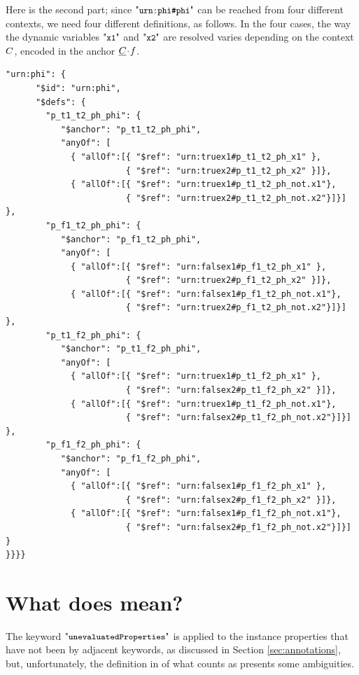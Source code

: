 \begin{toappendix}
{Here is the second part;
since $\qkw{urn:phi\#phi}$ can be reached from four different contexts, we need four different definitions, as follows.
In the four cases, the way the dynamic variables $\qkw{x1}$ and $\qkw{x2}$ are resolved varies depending on the context
$C$, encoded in the anchor $\underline{C}\!\cdot\! f$.

\begin{querybox}{}
\begin{lstlisting}[style=query,escapechar=Z]
    "urn:phi": {   
      "$id": "urn:phi",
      "$defs": {
        "p_t1_t2_ph_phi": {    
           "$anchor": "p_t1_t2_ph_phi", 
           "anyOf": [
             { "allOf":[{ "$ref": "urn:truex1#p_t1_t2_ph_x1" }, 
                        { "$ref": "urn:truex2#p_t1_t2_ph_x2" }]},
             { "allOf":[{ "$ref": "urn:truex1#p_t1_t2_ph_not.x1"}, 
                        { "$ref": "urn:truex2#p_t1_t2_ph_not.x2"}]}] },
        "p_f1_t2_ph_phi": {    
           "$anchor": "p_f1_t2_ph_phi", 
           "anyOf": [
             { "allOf":[{ "$ref": "urn:falsex1#p_f1_t2_ph_x1" }, 
                        { "$ref": "urn:truex2#p_f1_t2_ph_x2" }]},
             { "allOf":[{ "$ref": "urn:falsex1#p_f1_t2_ph_not.x1"}, 
                        { "$ref": "urn:truex2#p_f1_t2_ph_not.x2"}]}] },
        "p_t1_f2_ph_phi": {    
           "$anchor": "p_t1_f2_ph_phi", 
           "anyOf": [
             { "allOf":[{ "$ref": "urn:truex1#p_t1_f2_ph_x1" },
                        { "$ref": "urn:falsex2#p_t1_f2_ph_x2" }]},
             { "allOf":[{ "$ref": "urn:truex1#p_t1_f2_ph_not.x1"}, 
                        { "$ref": "urn:falsex2#p_t1_f2_ph_not.x2"}]}] },
        "p_f1_f2_ph_phi": {    
           "$anchor": "p_f1_f2_ph_phi", 
           "anyOf": [
             { "allOf":[{ "$ref": "urn:falsex1#p_f1_f2_ph_x1" }, 
                        { "$ref": "urn:falsex2#p_f1_f2_ph_x2" }]},
             { "allOf":[{ "$ref": "urn:falsex1#p_f1_f2_ph_not.x1"}, 
                        { "$ref": "urn:falsex2#p_f1_f2_ph_not.x2"}]}] }
}}}}
\end{lstlisting}
\end{querybox}

}%


\newpage

\section{What does {\evaluated} mean?}\label{sec:ambiguity}

The keyword $\qunProps$ is applied to the instance properties that have not been {\evaluated} by adjacent keywords,
as discussed in Section \ref{sec:annotations}, but,
unfortunately, the definition in \citep{specs2020} of what counts as {\evaluated} presents some ambiguities.


\end{toappendix}
